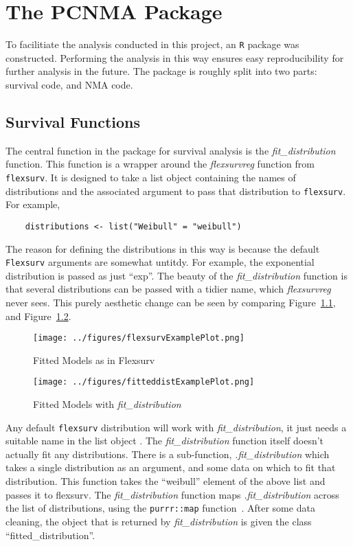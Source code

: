 \chapter{The PCNMA Package}\label{pack}

To facilitiate the analysis conducted in this project, an \verb|R| package was constructed. Performing the analysis in this way ensures easy reproducibility for further analysis in the future. The package is roughly split into two parts: survival code, and NMA code. 

\section{Survival Functions}
The central function in the package for survival analysis is the \textit{fit\_distribution} function. This function is a wrapper around the \textit{flexsurvreg} function from \verb|flexsurv|. It is designed to take a list object containing the names of distributions and the associated argument to pass that distribution to \verb|flexsurv|. For example, 

\begin{lstlisting}
    distributions <- list("Weibull" = "weibull")
\end{lstlisting}

The reason for defining the distributions in this way is because the default \verb|Flexsurv| arguments are somewhat untitdy. For example, the exponential distribution is passed as just ``exp''. The beauty of the \textit{fit\_distribution} function is that several distributions can be passed with a tidier name, which \textit{flexsurvreg} never sees. This purely aesthetic change can be seen by comparing Figure~\ref{fig:flexsurvlabelexample}, and Figure~\ref{fig:fitdistributionexampleplot}. \\

\begin{figure}[h]
    \texttt{[image: ../figures/flexsurvExamplePlot.png]}
    \caption{Fitted Models as in Flexsurv}
    \label{fig:flexsurvlabelexample}
\end{figure}

\begin{figure}[h]
    \texttt{[image: ../figures/fitteddistExamplePlot.png]}
    \caption{Fitted Models with \textit{fit\_distribution}}
    \label{fig:fitdistributionexampleplot}
\end{figure}

Any default \verb|flexsurv| distribution will work with \textit{fit\_distribution}, it just needs a suitable name in the list object . The \textit{fit\_distribution} function itself doesn't actually fit any distributions. There is a sub-function, \textit{.fit\_distribution} which takes a single distribution as an argument, and some data on which to fit that distribution. This function takes the ``weibull'' element of the above list and passes it to flexsurv. The \textit{fit\_distribution} function maps \textit{.fit\_distribution} across the list of distributions, using the \verb|purrr::map| function~\cite{purrr}. After some data cleaning, the object that is returned by \textit{fit\_distribution} is given the class ``fitted\_distribution''. 

